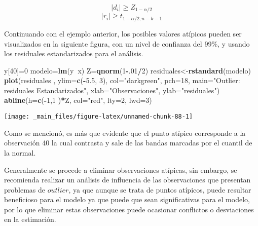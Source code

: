 \documentclass[a4paper,oneside,openany]{book}
\newenvironment{Shaded}{\begin{snugshade}}{\end{snugshade}}
\newcommand{\KeywordTok}[1]{\textcolor[rgb]{0.13,0.29,0.53}{\textbf{#1}}}
\newcommand{\DataTypeTok}[1]{\textcolor[rgb]{0.13,0.29,0.53}{#1}}
\newcommand{\DecValTok}[1]{\textcolor[rgb]{0.00,0.00,0.81}{#1}}
\newcommand{\FloatTok}[1]{\textcolor[rgb]{0.00,0.00,0.81}{#1}}
\newcommand{\StringTok}[1]{\textcolor[rgb]{0.31,0.60,0.02}{#1}}
\newcommand{\OperatorTok}[1]{\textcolor[rgb]{0.81,0.36,0.00}{\textbf{#1}}}
\newcommand{\NormalTok}[1]{#1}
\begin{document}
\[\mid d_{i} \mid \geq Z_{1-\alpha/2}\]
\[\mid r_{i}\mid  \geq t_{1-\alpha/2,n-k-1}\]

Continuando con el ejemplo anterior, los posibles valores atípicos
pueden ser visualizados en la siguiente figura, con un nivel de
confianza del 99\%, y usando los residuales estandarizados para el
análisis.

\begin{Shaded}
\begin{Highlighting}[]
\NormalTok{y[}\DecValTok{40}\NormalTok{]=}\DecValTok{0} 
\NormalTok{modelo=}\KeywordTok{lm}\NormalTok{(y}\OperatorTok{~}\NormalTok{x)}
\NormalTok{Z=}\KeywordTok{qnorm}\NormalTok{(}\DecValTok{1}\OperatorTok{-}\NormalTok{.}\DecValTok{01}\OperatorTok{/}\DecValTok{2}\NormalTok{)}
\NormalTok{residuales<-}\KeywordTok{rstandard}\NormalTok{(modelo) }
\KeywordTok{plot}\NormalTok{(residuales , }\DataTypeTok{ylim=}\KeywordTok{c}\NormalTok{(}\OperatorTok{-}\FloatTok{5.5}\NormalTok{, }\DecValTok{3}\NormalTok{), }\DataTypeTok{col=}\StringTok{"darkgreen"}\NormalTok{, }\DataTypeTok{pch=}\DecValTok{18}\NormalTok{, }\DataTypeTok{main=}\StringTok{"Outlier: }
\StringTok{       residuales Estandarizados"}\NormalTok{, }\DataTypeTok{xlab=}\StringTok{"Observaciones"}\NormalTok{, }\DataTypeTok{ylab=}\StringTok{"residuales"}\NormalTok{)}
\KeywordTok{abline}\NormalTok{(}\DataTypeTok{h=}\KeywordTok{c}\NormalTok{(}\OperatorTok{-}\DecValTok{1}\NormalTok{,}\DecValTok{1}\NormalTok{ )}\OperatorTok{*}\NormalTok{Z, }\DataTypeTok{col=}\StringTok{"red"}\NormalTok{, }\DataTypeTok{lty=}\DecValTok{2}\NormalTok{, }\DataTypeTok{lwd=}\DecValTok{3}\NormalTok{)}
\end{Highlighting}
\end{Shaded}

\begin{center}\texttt{[image: \_main\_files/figure-latex/unnamed-chunk-88-1]} \end{center}

Como se mencionó, es más que evidente que el punto atípico corresponde a
la observación 40 la cual contrasta y sale de las bandas marcadas por el
cuantil de la normal.

Generalmente se procede a eliminar observaciones atípicas, sin embargo,
se recomienda realizar un análisis de influencia de las observaciones
que presentan problemas de \(outlier\), ya que aunque se trata de puntos
atípicos, puede resultar beneficioso para el modelo ya que puede que
sean significativas para el modelo, por lo que eliminar estas
observaciones puede ocasionar conflictos o desviaciones en la
estimación.
\end{document}
